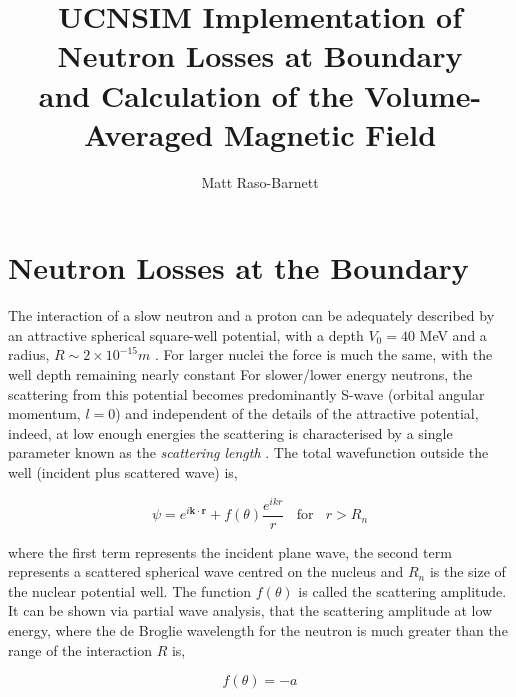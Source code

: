 \documentclass[11pt,a4paper,oneside]{article}
\begin{document}
\title{UCNSIM Implementation of Neutron Losses at Boundary \\ and Calculation of the Volume-Averaged Magnetic Field}
\author{Matt Raso-Barnett}
\maketitle


\section{Neutron Losses at the Boundary}

The interaction of a slow neutron and a proton can be adequately described by an attractive spherical square-well potential, with a depth $V_{0} = 40$ MeV and a radius, $R \sim 2\times10^{-15}m$ \cite{Go.Ri.La.91}. For larger nuclei the force is much the same, with the well depth remaining nearly constant For slower/lower energy neutrons, the scattering from this potential becomes predominantly S-wave (orbital angular momentum, $l = 0$) and independent of the details of the attractive potential, indeed, at low enough energies the scattering is characterised by a single parameter known as the \emph{scattering length} \cite{Go.Pe.79}. The total wavefunction outside the well (incident plus scattered wave) is,

\begin{equation}
\psi = e^{i \mathbf{k} \cdot \mathbf{r}} + f(\theta) \frac{e^{ikr}}{r} \ \ \ \ \mbox{for} \ \ \ \ r > R_{n}
\label{eqn:wavefunctionoutsidewell}
\end{equation}

where the first term represents the incident plane wave, the second term represents a scattered spherical wave centred on the nucleus and $R_{n}$ is the size of the nuclear potential well. The function $f(\theta)$ is called the scattering amplitude. It can be shown via partial wave analysis, that the scattering amplitude at low energy, where the de Broglie wavelength for the neutron is much greater than the range of the interaction $R$ is, 

\begin{equation}
f(\theta) = -a
\label{eqn:scatteringlength}
\end{equation}
\end{document}
